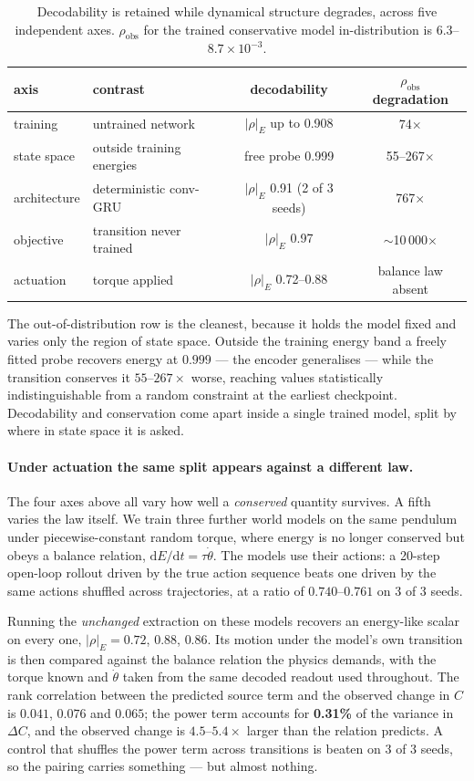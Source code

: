 \begin{table}[t]
\centering\small
\caption{Decodability is retained while dynamical structure degrades, across five independent axes.
$\rho_{\mathrm{obs}}$ for the trained conservative model in-distribution is $6.3$--$8.7\times10^{-3}$.}
\label{tab:axes}
\begin{tabular}{llcc}
\toprule
axis & contrast & decodability & $\rho_{\mathrm{obs}}$ degradation \\
\midrule
training & untrained network & $|\rho|_E$ up to 0.908 & 74$\times$ \\
state space & outside training energies & free probe 0.999 & 55--267$\times$ \\
architecture & deterministic conv-GRU & $|\rho|_E$ 0.91 (2 of 3 seeds) & 767$\times$ \\
objective & transition never trained & $|\rho|_E$ 0.97 & $\sim$10\,000$\times$ \\
actuation & torque applied & $|\rho|_E$ 0.72--0.88 & balance law absent \\
\bottomrule
\end{tabular}
\end{table}

The out-of-distribution row is the cleanest, because it holds the model fixed and varies only the
region of state space. Outside the training energy band a freely fitted probe recovers energy at
$0.999$ --- the encoder generalises --- while the transition conserves it $55$--$267\times$ worse,
reaching values statistically indistinguishable from a random constraint at the earliest checkpoint.
Decodability and conservation come apart inside a single trained model, split by where in state space
it is asked.

\paragraph{Under actuation the same split appears against a different law.}
The four axes above all vary how well a \emph{conserved} quantity survives. A fifth varies the law
itself. We train three further world models on the same pendulum under piecewise-constant random
torque, where energy is no longer conserved but obeys a balance relation,
$\mathrm{d}E/\mathrm{d}t = \tau\dot\theta$. The models use their actions: a 20-step open-loop rollout
driven by the true action sequence beats one driven by the same actions shuffled across trajectories,
at a ratio of $0.740$--$0.761$ on 3 of 3 seeds.

Running the \emph{unchanged} extraction on these models recovers an energy-like scalar on every one,
$|\rho|_E = 0.72$, $0.88$, $0.86$. Its motion under the model's own transition is then compared
against the balance relation the physics demands, with the torque known and $\dot\theta$ taken from
the same decoded readout used throughout. The rank correlation between the predicted source term and
the observed change in $C$ is $0.041$, $0.076$ and $0.065$; the power term accounts for
\textbf{0.31\%} of the variance in $\Delta C$, and the observed change is $4.5$--$5.4\times$ larger
than the relation predicts. A control that shuffles the power term across transitions is beaten on
3 of 3 seeds, so the pairing carries something --- but almost nothing.

